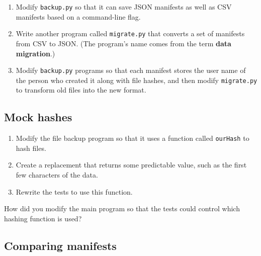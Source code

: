 \documentclass{scrbook}
\newcommand{\glossref}[1]{\textbf{#1}}
\begin{document}
\begin{enumerate}

\item 

Modify \texttt{backup.py} so that it can save JSON manifests as well as CSV manifests
    based on a command-line flag.



\item 

Write another program called \texttt{migrate.py} that converts a set of manifests
    from CSV to JSON.
    (The program's name comes from the term \glossref{data migration}.)



\item 

Modify \texttt{backup.py} programs so that each manifest stores the user name of the person who created it
    along with file hashes,
    and then modify \texttt{migrate.py} to transform old files into the new format.



\end{enumerate}

\subsection*{Mock hashes}

\begin{enumerate}

\item 

Modify the file backup program so that it uses a function called \texttt{ourHash} to hash files.



\item 

Create a replacement that returns some predictable value, such as the first few characters of the data.



\item 

Rewrite the tests to use this function.



\end{enumerate}


How did you modify the main program so that the tests could control which hashing function is used?

\subsection*{Comparing manifests}
\end{document}
